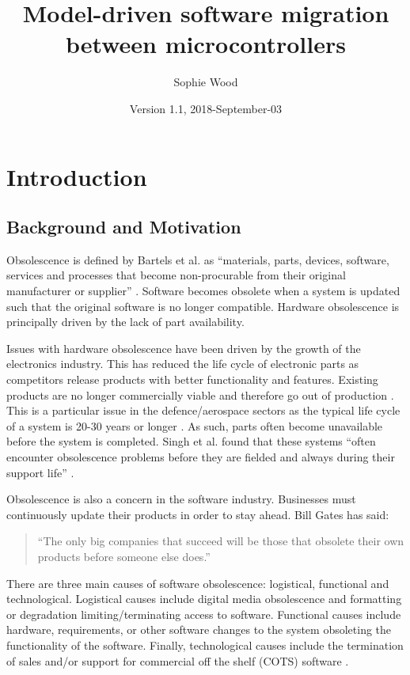 \documentclass{UoYCSproject}
\author{Sophie Wood}
\title{Model-driven software migration between microcontrollers}
\date{Version 1.1, 2018-September-03}
\begin{document}
\maketitle
\listoffigures
\listoftables

\chapter{Introduction}
\section{Background and Motivation}

Obsolescence is defined by Bartels et al. as ``materials, parts, devices, software, services and processes that become non-procurable from their original manufacturer or supplier'' \parencite{bartels2012strategies}. Software becomes obsolete when a system is updated such that the original software is no longer compatible. Hardware obsolescence is principally driven by the lack of part availability.

Issues with hardware obsolescence have been driven by the growth of the electronics industry. This has reduced the life cycle of electronic parts as competitors release products with better functionality and features. Existing products are no longer commercially viable and therefore go out of production \parencite{bartels2012strategies}. This is a particular issue in the defence/aerospace sectors as the typical life cycle of a system is 20-30 years or longer \parencite{rojo2010obsolescence}. As such, parts often become unavailable before the system is completed. Singh et al. found that these systems ``often encounter obsolescence problems before they are fielded and always during their support life'' \parencite{singh2006obsolescence}.

Obsolescence is also a concern in the software industry. Businesses must continuously update their products in order to stay ahead. Bill Gates has said: 
\begin{quote}
``The only big companies that succeed will be those that obsolete their own products before someone else does.'' \parencite{bartels2012strategies}
\end{quote}
There are three main causes of software obsolescence: logistical, functional and technological. Logistical causes include digital media obsolescence and formatting or degradation limiting/terminating access to software. Functional causes include hardware, requirements, or other software changes to the system obsoleting the functionality of the software. Finally, technological causes include the termination of sales and/or support for commercial off the shelf (COTS) software \parencite{sandborn2007obsolescence}. 
\end{document}
